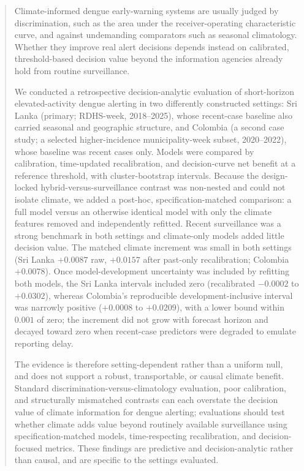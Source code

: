 \documentclass[11pt,a4paper]{article}
\begin{document}
\begin{abstract}
\noindent Climate-informed dengue early-warning systems are usually judged by discrimination, such as the area under the receiver-operating characteristic curve, and against undemanding comparators such as seasonal climatology. Whether they improve real alert decisions depends instead on calibrated, threshold-based decision value beyond the information agencies already hold from routine surveillance.

\noindent We conducted a retrospective decision-analytic evaluation of short-horizon elevated-activity dengue alerting in two differently constructed settings: Sri Lanka (primary; RDHS-week, 2018--2025), whose recent-case baseline also carried seasonal and geographic structure, and Colombia (a second case study; a selected higher-incidence municipality-week subset, 2020--2022), whose baseline was recent cases only. Models were compared by calibration, time-updated recalibration, and decision-curve net benefit at a reference threshold, with cluster-bootstrap intervals. Because the design-locked hybrid-versus-surveillance contrast was non-nested and could not isolate climate, we added a post-hoc, specification-matched comparison: a full model versus an otherwise identical model with only the climate features removed and independently refitted. Recent surveillance was a strong benchmark in both settings and climate-only models added little decision value. The matched climate increment was small in both settings (Sri Lanka $+0.0087$ raw, $+0.0157$ after past-only recalibration; Colombia $+0.0078$). Once model-development uncertainty was included by refitting both models, the Sri Lanka intervals included zero (recalibrated $-0.0002$ to $+0.0302$), whereas Colombia's reproducible development-inclusive interval was narrowly positive ($+0.0008$ to $+0.0209$), with a lower bound within $0.001$ of zero; the increment did not grow with forecast horizon and decayed toward zero when recent-case predictors were degraded to emulate reporting delay.

\noindent The evidence is therefore setting-dependent rather than a uniform null, and does not support a robust, transportable, or causal climate benefit. Standard discrimination-versus-climatology evaluation, poor calibration, and structurally mismatched contrasts can each overstate the decision value of climate information for dengue alerting; evaluations should test whether climate adds value beyond routinely available surveillance using specification-matched models, time-respecting recalibration, and decision-focused metrics. These findings are predictive and decision-analytic rather than causal, and are specific to the settings evaluated.
\end{abstract}
\end{document}
